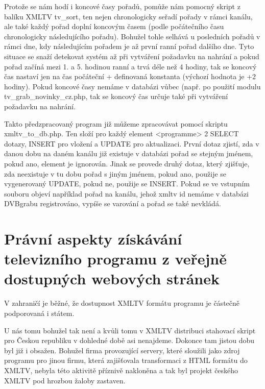 \vspace{10pt}

Protože se nám hodí i koncové časy pořadů, pomůže nám pomocný skript z balíku XMLTV tv\_sort, ten nejen chronologicky seřadí pořady v rámci kanálu, ale také každý pořad doplní koncovým časem (podle počátečního času chronologicky následujícího pořadu). Bohužel tohle selhává u posledních pořadů v rámci dne, kdy následujícím pořadem je až první ranní pořad dalšího dne. Tyto situace se snaží detekovat systém až při vytváření požadavku na nahrání a pokud pořad začíná mezi 1. a 5. hodinou ranní a trvá déle než 4 hodiny, tak se koncový čas nastaví jen na čas počáteční + definovaná konstanta (výchozí hodnota je +2 hodiny). Pokud koncové časy nemáme v databázi vůbec (např. po použití modulu tv\_grab\_novinky\_cz.php, tak se koncový čas určuje také při vytváření požadavku na nahrání.

\vspace{10pt}

Takto předzpracovaný program již můžeme zpracovávat pomocí skriptu xmltv\_to\_db.php. Ten složí pro každý element <programme> 2 SELECT dotazy, INSERT pro vložení a UPDATE pro aktualizaci. První dotaz zjistí, zda v danou dobu na daném kanálu již existuje v databázi pořad se stejným jménem, pokud ano, element je ignorován. Jinak se provede druhý dotaz, který zjišťuje, zda neexistuje v tu dobu pořad s jiným jménem, pokud ano, použije se vygenerovaný UPDATE, pokud ne, použije se INSERT. Pokud se ve vstupním souboru objeví například pořad na kanálu, jehož xmltv id nemáme v databázi DVBgrabu registrováno, vypíše se varování a pořad se také nevkládá.

\vspace{10pt}

\section{Právní aspekty získávání televizního programu z veřejně dostupných webových stránek}

\vspace{10pt}

V zahraničí je běžné, že dostupnost XMLTV formátu programu je částečně podporovaná i státem. 

\vspace{10pt}

U nás tomu bohužel tak není a kvůli tomu v XMLTV distribuci stahovací skript pro Českou republiku v dohledné době asi nenajdeme. Dokonce tam jistou dobu byl již i obsažen. Bohužel firma provozující servery, které sloužili jako zdroj programu pro jinou firmu, která zajišťovala transformaci z HTML formátu do XMLTV, nebyla této aktivitě příznivě nakloněna a tak byl projekt českého XMLTV pod hrozbou žaloby zastaven.

